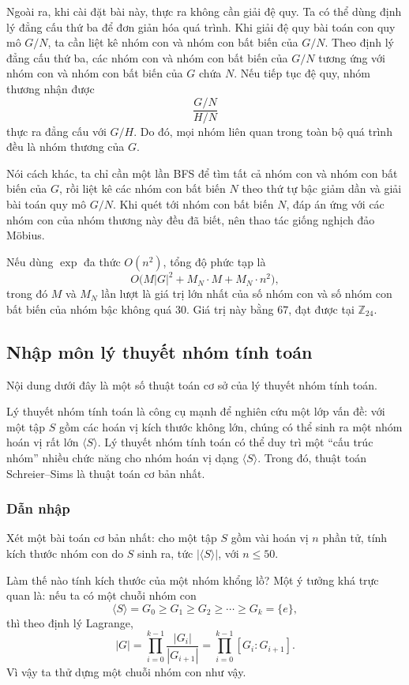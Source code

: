 \documentclass[11pt]{article}
\begin{document}
Ngoài ra, khi cài đặt bài này, thực ra không cần giải đệ quy. Ta có thể dùng
định lý đẳng cấu thứ ba để đơn giản hóa quá trình. Khi giải đệ quy bài toán con
quy mô \(G/N\), ta cần liệt kê nhóm con và nhóm con bất biến của \(G/N\). Theo
định lý đẳng cấu thứ ba, các nhóm con và nhóm con bất biến của \(G/N\) tương
ứng với nhóm con và nhóm con bất biến của \(G\) chứa \(N\). Nếu tiếp tục đệ quy,
nhóm thương nhận được
\[
  \frac{G/N}{H/N}
\]
thực ra đẳng cấu với \(G/H\). Do đó, mọi nhóm liên quan trong toàn bộ quá trình
đều là nhóm thương của \(G\).

Nói cách khác, ta chỉ cần một lần BFS để tìm tất cả nhóm con và nhóm con bất
biến của \(G\), rồi liệt kê các nhóm con bất biến \(N\) theo thứ tự bậc giảm
dần và giải bài toán quy mô \(G/N\). Khi quét tới nhóm con bất biến \(N\), đáp
án ứng với các nhóm con của nhóm thương này đều đã biết, nên thao tác giống
nghịch đảo Möbius.

Nếu dùng \(\exp\) đa thức \(O(n^2)\), tổng độ phức tạp là
\[
  O\bigl(M|G|^2+M_N\cdot M+M_N\cdot n^2\bigr),
\]
trong đó \(M\) và \(M_N\) lần lượt là giá trị lớn nhất của số nhóm con và số
nhóm con bất biến của nhóm bậc không quá \(30\). Giá trị này bằng \(67\), đạt
được tại \(\mathbb{Z}_{24}\).

\subsection{Nhập môn lý thuyết nhóm tính toán}

Nội dung dưới đây là một số thuật toán cơ sở của lý thuyết nhóm tính toán.

Lý thuyết nhóm tính toán là công cụ mạnh để nghiên cứu một lớp vấn đề: với một
tập \(S\) gồm các hoán vị kích thước không lớn, chúng có thể sinh ra một nhóm
hoán vị rất lớn \(\langle S\rangle\). Lý thuyết nhóm tính toán có thể duy trì
một ``cấu trúc nhóm'' nhiều chức năng cho nhóm hoán vị dạng \(\langle S\rangle\).
Trong đó, thuật toán Schreier--Sims là thuật toán cơ bản nhất.

\subsubsection{Dẫn nhập}

Xét một bài toán cơ bản nhất: cho một tập \(S\) gồm vài hoán vị \(n\) phần tử,
tính kích thước nhóm con do \(S\) sinh ra, tức \(|\langle S\rangle|\), với
\(n\le 50\).

Làm thế nào tính kích thước của một nhóm khổng lồ? Một ý tưởng khá trực quan
là: nếu ta có một chuỗi nhóm con
\[
  \langle S\rangle=G_0\ge G_1\ge G_2\ge\cdots\ge G_k=\{e\},
\]
thì theo định lý Lagrange,
\[
  |G|=\prod_{i=0}^{k-1}\frac{|G_i|}{|G_{i+1}|}
  =\prod_{i=0}^{k-1}[G_i:G_{i+1}].
\]
Vì vậy ta thử dựng một chuỗi nhóm con như vậy.
\end{document}
